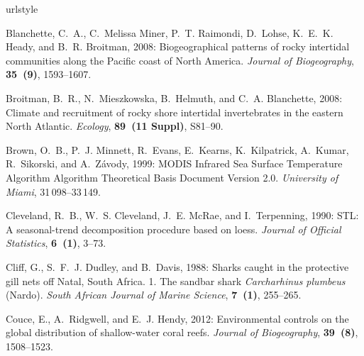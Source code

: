 \documentclass{ametsoc}
\begin{document}
\begin{thebibliography}{23}
\providecommand{\natexlab}[1]{#1}
\providecommand{\url}[1]{\texttt{#1}}
\renewcommand{\UrlFont}{\rmfamily}
\providecommand{\urlprefix}{URL }
\expandafter\ifx\csname urlstyle\endcsname\relax
  \providecommand{\doi}[1]{doi:\discretionary{}{}{}#1}\else
  \providecommand{\doi}{doi:\discretionary{}{}{}\begingroup
  \urlstyle{rm}\Url}\fi
\providecommand{\eprint}[2][]{\url{#2}}

Blanchette, C.~A., C.~{Melissa Miner}, P.~T. Raimondi, D.~Lohse, K.~E.~K.
  Heady, and B.~R. Broitman, 2008: {Biogeographical patterns of rocky
  intertidal communities along the Pacific coast of North America}.
  \textit{Journal of Biogeography}, \textbf{35~(9)}, 1593--1607.

Broitman, B.~R., N.~Mieszkowska, B.~Helmuth, and C.~A. Blanchette, 2008:
  {Climate and recruitment of rocky shore intertidal invertebrates in the
  eastern North Atlantic.} \textit{Ecology}, \textbf{89~(11 Suppl)}, S81--90.

Brown, O.~B., P.~J. Minnett, R.~Evans, E.~Kearns, K.~Kilpatrick, A.~Kumar,
  R.~Sikorski, and A.~Z{\'{a}}vody, 1999: {MODIS Infrared Sea Surface
  Temperature Algorithm Algorithm Theoretical Basis Document Version 2.0}.
  \textit{University of Miami}, 31\,098--33\,149.

Cleveland, R.~B., W.~S. Cleveland, J.~E. McRae, and I.~Terpenning, 1990: {STL:
  A seasonal-trend decomposition procedure based on loess}. \textit{Journal of
  Official Statistics}, \textbf{6~(1)}, 3--73.

Cliff, G., S.~F.~J. Dudley, and B.~Davis, 1988: {Sharks caught in the
  protective gill nets off Natal, South Africa. 1. The sandbar shark
  \textit{Carcharhinus plumbeus} (Nardo)}. \textit{South African Journal of Marine
  Science}, \textbf{7~(1)}, 255--265.

Couce, E., A.~Ridgwell, and E.~J. Hendy, 2012: {Environmental controls on the
  global distribution of shallow-water coral reefs}. \textit{Journal of
  Biogeography}, \textbf{39~(8)}, 1508--1523.


\end{thebibliography}
\end{document}
